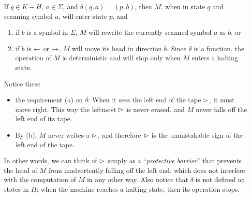 If $q \in K - H$, $a \in \Sigma$, and $\delta(q, a) = (p, b)$, then $M$, when in state $q$ and scanning symbol $a$, will enter state $p$, and
\begin{enumerate}
  \item if $b$ is a symbol in $\Sigma$, $M$ will rewrite the currently scanned symbol $a$ as $b$, or 
  \item if $b$ is $\leftarrow$ or $\rightarrow$, $M$ will move its head in direction $b$. Since $\delta$ is a function, the operation of $M$ is deterministic and will stop only when $M$ enters a halting state.
\end{enumerate}
Notice these
\begin{itemize}
  \item the requirement (a) on $\delta$: When it sees the left end of the tape $\vartriangleright$, it must move right. This way the leftmost $\vartriangleright$ is never erased, and $M$ never falls off the left end of its tape.
  \item By (b), $M$ never writes a $\vartriangleright$, and therefore $\vartriangleright$ is the unmistakable sign of the left end of the tape.
\end{itemize}
In other words, we can think of $\vartriangleright$ simply as a ``\textit{protective barrier}'' that prevents the head of $M$ from inadvertently falling off the left end, which does not interfere with the computation of $M$ in any other way. Also notice that $\delta$ is not defined on states in $H$; when the machine reaches a halting state, then its operation stops.

\vspace*{\fill}
\columnbreak

